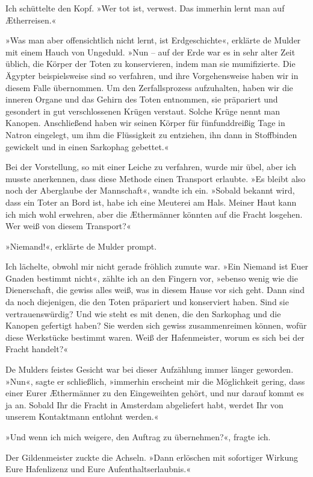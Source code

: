 Ich schüttelte den Kopf. »Wer tot ist, verwest. Das immerhin lernt
man auf Ætherreisen.«

»Was man aber offensichtlich nicht lernt, ist Erdgeschichte«,
erklärte de Mulder mit einem Hauch von Ungeduld. »Nun – auf der
Erde war es in sehr alter Zeit üblich, die Körper der Toten zu
konservieren, indem man sie mumifizierte. Die Ägypter
beispielsweise sind so verfahren, und ihre Vorgehensweise haben wir
in diesem Falle übernommen. Um den Zerfallsprozess aufzuhalten,
haben wir die inneren Organe und das Gehirn des Toten entnommen,
sie präpariert und gesondert in gut verschlossenen Krügen verstaut.
Solche Krüge nennt man Kanopen. Anschließend haben wir seinen
Körper für fünfunddreißig Tage in Natron eingelegt, um ihm die
Flüssigkeit zu entziehen, ihn dann in Stoffbinden gewickelt und in
einen Sarkophag gebettet.«

Bei der Vorstellung, so mit einer Leiche zu verfahren, wurde mir
übel, aber ich musste anerkennen, dass diese Methode einen
Transport erlaubte. »Es bleibt also noch der Aberglaube der
Mannschaft«, wandte ich ein. »Sobald bekannt wird, dass ein Toter
an Bord ist, habe ich eine Meuterei am Hals. Meiner Haut kann ich
mich wohl erwehren, aber die Æthermänner könnten auf die Fracht
losgehen. Wer weiß von diesem Transport?«

»Niemand!«, erklärte de Mulder prompt.

Ich lächelte, obwohl mir nicht gerade fröhlich zumute war. »Ein
Niemand ist Euer Gnaden bestimmt nicht«, zählte ich an den Fingern
vor, »ebenso wenig wie die Dienerschaft, die gewiss alles weiß, was
in diesem Hause vor sich geht. Dann sind da noch diejenigen, die
den Toten präpariert und konserviert haben. Sind sie
vertrauenswürdig? Und wie steht es mit denen, die den Sarkophag und
die Kanopen gefertigt haben? Sie werden sich gewiss zusammenreimen
können, wofür diese Werkstücke bestimmt waren. Weiß der
Hafenmeister, worum es sich bei der Fracht handelt?«

De Mulders feistes Gesicht war bei dieser Aufzählung immer länger
geworden. »Nun«, sagte er schließlich, »immerhin erscheint mir die
Möglichkeit gering, dass einer Eurer Æthermänner zu den
Eingeweihten gehört, und nur darauf kommt es ja an. Sobald Ihr die
Fracht in Amsterdam abgeliefert habt, werdet Ihr von unserem
Kontaktmann entlohnt werden.«

»Und wenn ich mich weigere, den Auftrag zu übernehmen?«, fragte
ich.

Der Gildenmeister zuckte die Achseln. »Dann erlöschen mit
sofortiger Wirkung Eure Hafenlizenz und Eure
Aufenthaltserlaubnis.«

